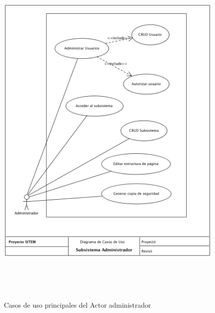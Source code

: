 \begin{figure}
 \centering
 \includegraphics[width=156mm, height=182mm]{casos_admin.png}
 \caption{Casos de uso principales del Actor administrador}
 \label{casos_admin}
\end{figure}

